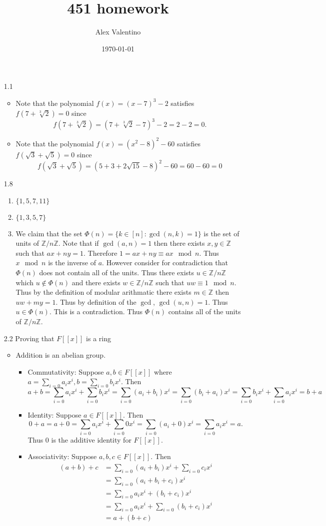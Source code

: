 \documentclass[12pt, letterpaper]{article}
\date{\today}
\author{Alex Valentino}
\title{451 homework}
\newcommand{\Z}{\mathbb{Z}}
\begin{document}
\begin{enumerate}
	\item[1.1] 
	\begin{itemize}
		\item Note that the polynomial $f(x) = (x-7)^3 - 2$ satisfies 
		$f(7 + \sqrt[3]{2}) = 0$ since 
		$$
			f(7 + \sqrt[3]{2}) = (7 + \sqrt[3]{2} - 7)^3 - 2 = 2 - 2 = 0.
		$$
		\item Note that the polynomial $f(x) = (x^2 - 8)^2 - 60$ satisfies 
		$f(\sqrt{3}+\sqrt{5}) = 0$ since 
		$$
			f(\sqrt{3}+\sqrt{5}) = (5 + 3 + 2\sqrt{15} - 8)^2 - 60 = 60 - 60 = 0
		$$
	\end{itemize}
	\item[1.8]
	\begin{enumerate}
		\item $\{1,5,7,11\}$
		\item $\{1,3,5,7\}$
		\item We claim that the set $\Phi(n) = \{k \in [n]: \gcd(n,k)=1\}$ is the set of units of $\Z/n\Z$.  Note that if $\gcd(a,n)=1$ then there exists 
		$x,y \in \Z$ such that $ax + ny = 1$.  Therefore $1 = ax + ny \equiv ax \mod{n}$.  Thus $x\mod n$ is the inverse of $a$.  However consider 
		for contradiction that $\Phi(n)$ does not contain all of the units.
		Thus there exists $u \in \Z/n\Z$ which $u \not \in \Phi(n)$ and there exists $w \in \Z/n\Z$ such that $uw \equiv 1 \mod{n}$.  Thus by the definition of modular arithmatic there exists $m \in \Z$ then $uw + my = 1$.
		Thus by definition of the $\gcd$, $\gcd(u,n) = 1$.  Thus $u \in \Phi(n)$.  This is a contradiction.  Thus $\Phi(n)$ contains all of the units of $\Z/n\Z$.   
	\end{enumerate}
	\item[2.2] Proving that $F[[x]]$ is a ring
	\begin{itemize}
		\item Addition is an abelian group.
		\begin{itemize}
			\item Commutativity: Suppose $a,b \in F[[x]]$ where 
			$a = \sum_{i=0}a_ix^i, b=\sum_{i=0} b_ix^i$.  Then 
			$$
			a+b = \sum_{i=0}a_ix^i + \sum_{i=0} b_ix^i = \sum_{i=0} (a_i + b_i ) x^i = \sum_{i=0} (b_i + a_i) x^i =  \sum_{i=0} b_ix^i + \sum_{i=0}a_ix^i = b + a
			$$
			\item Identity: Suppose $a \in F[[x]]$.  Then 
			$$
			0 + a = a + 0 = \sum_{i=0}a_ix^i + \sum_{i=0} 0 x^i = 
			\sum_{i=0} (a_i + 0)x^i = \sum_{i=0}a_ix^i = a.
			$$
			Thus $0$ is the additive identity for $F[[x]]$.
			\item Associativity: Suppose $a,b,c \in F[[x]]$.  Then
			\begin{align*}
			(a+b) + c &= \sum_{i=0}(a_i + b_i)x^i + \sum_{i=0}c_ix^i\\
			&= \sum_{i=0}(a_i + b_i + c_i)x^i\\ &= \sum_{i=0}a_ix^i + (b_i + c_i)x^i\\ &= \sum_{i=0}a_ix^i + \sum_{i=0}(b_i + c_i)x^i\\ &= a + (b+c)
			\end{align*}
			

\end{itemize}
\end{itemize}
\end{enumerate}
\end{document}
